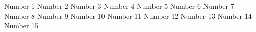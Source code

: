 Number 1
Number 2
Number 3
Number 4
Number 5
Number 6
Number 7
Number 8
Number 9
Number 10
Number 11
Number 12
Number 13
Number 14
Number 15